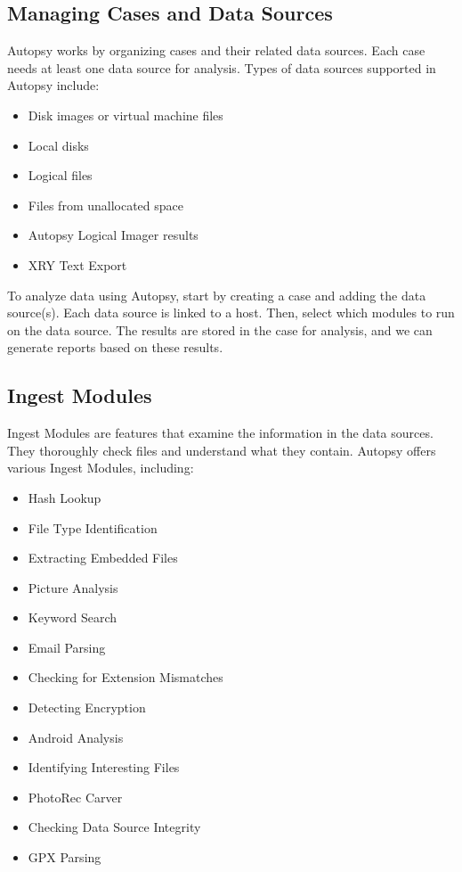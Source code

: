 \documentclass{article}
\begin{document}
\subsection{Managing Cases and Data Sources}
Autopsy works by organizing cases and their related data sources. Each case needs at least one data source for analysis. Types of data sources supported in Autopsy include:
\begin{itemize}
    \item Disk images or virtual machine files
    \item Local disks
    \item Logical files
    \item Files from unallocated space
    \item Autopsy Logical Imager results
    \item XRY Text Export
\end{itemize}
To analyze data using Autopsy, start by creating a case and adding the data source(s). Each data source is linked to a host. Then, select which modules to run on the data source. The results are stored in the case for analysis, and we can generate reports based on these results.

\subsection{Ingest Modules}

Ingest Modules are features that examine the information in the data sources. They thoroughly check files and understand what they contain.
Autopsy offers various Ingest Modules, including:

\begin{itemize}
    \item Hash Lookup
    \item File Type Identification
    \item Extracting Embedded Files
    \item Picture Analysis
    \item Keyword Search
    \item Email Parsing
    \item Checking for Extension Mismatches
    \item Detecting Encryption
    \item Android Analysis
    \item Identifying Interesting Files
    \item PhotoRec Carver
    \item Checking Data Source Integrity
    \item GPX Parsing
\end{itemize}
\end{document}
